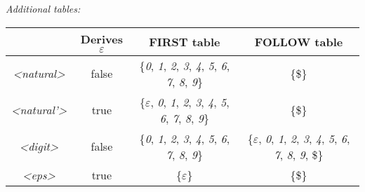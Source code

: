 \documentclass[10pt,a1paper]{memoir}
\begin{document}
\begin{center}
\textsl{Additional tables:}

\begin{tabular}{ |c||c|c|c| }
\hline
 & Derives $\varepsilon$ & FIRST table & FOLLOW table \\
\hline\hline
\textsl{\textless natural\textgreater} & false & \{\textit{0}, \textit{1}, \textit{2}, \textit{3}, \textit{4}, \textit{5}, \textit{6}, \textit{7}, \textit{8}, \textit{9}\} & \{\$\}\\ \hline
\textsl{\textless natural'\textgreater} & true & \{$\varepsilon$, \textit{0}, \textit{1}, \textit{2}, \textit{3}, \textit{4}, \textit{5}, \textit{6}, \textit{7}, \textit{8}, \textit{9}\} & \{\$\}\\ \hline
\textsl{\textless digit\textgreater} & false & \{\textit{0}, \textit{1}, \textit{2}, \textit{3}, \textit{4}, \textit{5}, \textit{6}, \textit{7}, \textit{8}, \textit{9}\} & \{$\varepsilon$, \textit{0}, \textit{1}, \textit{2}, \textit{3}, \textit{4}, \textit{5}, \textit{6}, \textit{7}, \textit{8}, \textit{9}, \$\}\\ \hline
\textsl{\textless eps\textgreater} & true & \{$\varepsilon$\} & \{\$\}\\
\hline
\end{tabular}

\end{center}     
\end{document}
